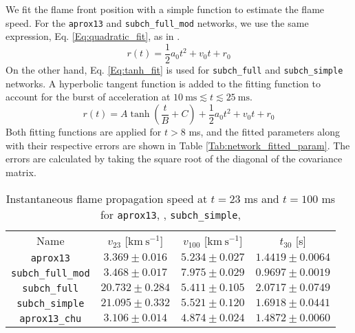 \documentclass[preprint,times,tighten,linenumbers,trackchanges]{aastex631}
\begin{document}
We fit the flame front position with a simple function to estimate
the flame speed.  For the {\tt aprox13} and {\tt subch\_full\_mod} networks, we use the same expression, Eq. \ref{Eq:quadratic_fit}, 
as in \citet{harpole:2021}.
\begin{equation}\label{Eq:quadratic_fit}
    r(t) = \frac{1}{2}a_0 t^2 + v_0 t + r_0
\end{equation}
On the other hand, Eq. \ref{Eq:tanh_fit} is used for {\tt subch\_full} and {\tt subch\_simple} networks. A hyperbolic tangent function is added to the fitting function to account for the burst of acceleration at $10 \ \mbox{ms} \lesssim t \lesssim 25 \ \mbox{ms}$.
\begin{equation}\label{Eq:tanh_fit}
    r(t) = A\tanh{\left(\frac{t}{B} + C\right)} + \frac{1}{2}a_0 t^2 + v_0 t + r_0
\end{equation}
Both fitting functions are applied for $t > 8$ ms, and the fitted parameters along with their respective errors are shown in Table \ref{Tab:network_fitted_param}. The errors are calculated by taking the square root of the diagonal of the covariance matrix. 


\begin{table*}
\caption{\label{Tab:network_instan_vel}
Instantaneous flame propagation speed at $t = 23$ ms and $t = 100$ ms for {\tt aprox13}, , {\tt subch\_simple},   
}

\begin{ruledtabular}
\footnotesize
\centering
\begin{tabular}{cccc}
\small 
Name &
$v_{23}$ [$\mbox{km} \ \mbox{s}^{-1}$] &
$v_{100}$ [$\mbox{km} \ \mbox{s}^{-1}$] &
$t_{30}$ [s]
\\
\colrule

{\tt aprox13} & $3.369 \pm 0.016$ & $5.234 \pm 0.027$ & $1.4419 \pm 0.0064$\\
{\tt subch\_full\_mod} & $3.468 \pm 0.017$ & $7.975 \pm 0.029$ & $0.9697 \pm 0.0019$ \\
{\tt subch\_full} & $20.732 \pm 0.284$ & $5.411 \pm 0.105$ & $2.0717 \pm 0.0749$ \\
{\tt subch\_simple} & $21.095 \pm 0.332$ & $5.521 \pm 0.120$ & $1.6918 \pm 0.0441$ \\
{\tt aprox13\_chu} & $3.106 \pm 0.014$ & $4.874 \pm 0.024$ & $1.4872 \pm 0.0060$ \\
\end{tabular}
\end{ruledtabular}
\end{table*}
\end{document}
